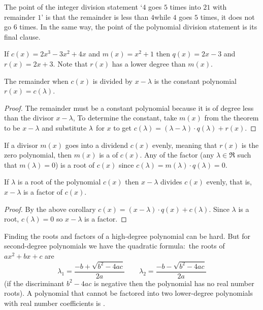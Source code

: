 The point of the integer division statement
`\( 4 \) goes \( 5 \) times into \( 21 \) with remainder \( 1 \)'
is that the remainder is less than \( 4 \)\Dash while \( 4 \) goes \( 5 \)
times, it does not go \( 6 \) times.
In the same way, the point of the polynomial division statement
is its final clause.

\begin{example}
If \( c(x)=2x^3-3x^2+4x \) and \( m(x)=x^2+1 \) then \( q(x)=2x-3 \) and
\( r(x)=2x+3 \).
Note that \( r(x) \) has a lower degree than \( m(x) \).
\end{example}

\begin{corollary}
The remainder when \( c(x) \) is divided by \( x-\lambda \) is the constant
polynomial \( r(x)=c(\lambda) \).
\end{corollary}

\begin{proof}
The remainder must be a constant polynomial
because it is of degree less than the divisor \( x-\lambda \), 
To determine the constant,
take $m(x)$ from the theorem to be $x-\lambda$ and 
substitute \( \lambda\/ \) for $x$ to get
\( c(\lambda)=(\lambda-\lambda)\cdot q(\lambda)+r(x) \). 
\end{proof}

If a divisor \( m(x) \) goes into a dividend \( c(x) \) evenly,
meaning that \( r(x) \) is the zero polynomial,
then \( m(x) \) is a  of \( c(x) \).
Any  of the factor (any \( \lambda\in\Re \) such that
\( m(\lambda)=0 \)) is a root of \( c(x) \) since
\( c(\lambda)=m(\lambda)\cdot q(\lambda)=0 \).

\begin{corollary}
If \( \lambda \) is a root of the polynomial \( c(x) \)
then \( x-\lambda \) divides \( c(x) \) evenly, that is, 
$x-\lambda$ is a factor of $c(x)$.
\end{corollary}

\begin{proof}
By the above corollary $c(x)=(x-\lambda)\cdot q(x)+c(\lambda)$.
Since $\lambda$ is a root, 
$c(\lambda)=0$ so $x-\lambda$ is a factor.  
\end{proof}

Finding the roots and factors of a high-degree polynomial can be hard.
But for second-degree polynomials we have the quadratic formula:~the
roots of \( ax^2+bx+c \) are
\begin{equation*}
   \lambda_1=\frac{-b+\sqrt{b^2-4ac}}{2a}
   \qquad
   \lambda_2=\frac{-b-\sqrt{b^2-4ac}}{2a}
\end{equation*}
(if the discriminant \( b^2-4ac \) is negative then the polynomial
has no real number roots).
A polynomial that cannot be factored into two lower-degree polynomials
with real number coefficients is .

